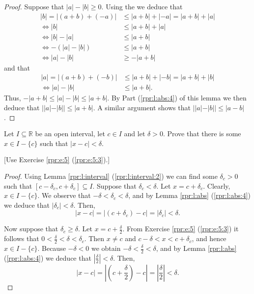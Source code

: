 \begin{proof}
	Suppose that $|a| - |b| \geq 0$. Using the  we deduce that
	\begin{align*}
		|b| = |(a + b) + (-a)| & \leq |a + b| + |-a| = |a + b| + |a| \\
		\iff |b|               & \leq |a + b| + |a|                  \\
		\iff |b| - |a|         & \leq |a + b|                        \\
		\iff -(|a| - |b|)      & \leq |a + b|                        \\
		\iff |a| - |b|         & \geq -|a + b|
	\end{align*}
	and that
	\begin{align*}
		|a| = |(a + b) + (-b)| & \leq |a + b| + |-b| = |a + b| + |b| \\
		\iff |a| - |b|         & \leq |a + b|.
	\end{align*}
	Thus, $-|a + b| \leq |a| - |b| \leq |a + b|$. By Part (\ref{rpr:l:abs:4}) of this lemma we then deduce that ${||a| - |b|| \leq |a + b|}$. A similar argument shows that $||a| - |b|| \leq |a - b|$.
\end{proof}


\Newpage
\begin{exercise} %
	Let $I \subseteq \mathbb{R}$ be an open interval, let $c \in I$ and let $\delta > 0$. Prove that there is some $x \in I - \{ c \}$ such that $|x - c| < \delta$.

	\hfill [Use Exercise \ref{rpr:e:5} (\ref{rpr:e:5:3}).]
\end{exercise}

\begin{proof}
	Using Lemma \ref{rpr:l:interval} (\ref{rpr:l:interval:2}) we can find some $\delta_c > 0$ such that $[c - \delta_{c}, c + \delta_{c}] \subseteq I$. Suppose that $\delta_c < \delta$. Let $x = c + \delta_c$. Clearly, $x \in I - \{ c \}$. We observe that $-\delta < \delta_c < \delta$, and by Lemma \ref{rpr:l:abs} (\ref{rpr:l:abs:4}) we deduce that $|\delta_c| < \delta$. Then,
	$$
		|x - c| = |(c + \delta_c) - c| = |\delta_c| < \delta.
	$$

	Now suppose that $\delta_c \geq \delta$. Let $x = c + \frac{\delta}{2}$. From Exercise \ref{rpr:e:5} (\ref{rpr:e:5:3}) it follows that $0 < \frac{\delta}{2} < \delta < \delta_c$. Then $x \neq c$ and $c - \delta < x < c + \delta_c$, and hence $x \in I - \{ c \}$. Because $-\delta < 0$ we obtain $-\delta < \frac{\delta}{2} < \delta$, and by Lemma \ref{rpr:l:abs} (\ref{rpr:l:abs:4}) we deduce that $\left| \frac{\delta}{2} \right| < \delta$. Then,
	$$
		|x - c| = \left| \left( c + \frac{\delta}{2} \right) - c \right| = \left| \frac{\delta}{2} \right| < \delta.
	$$
\end{proof}


